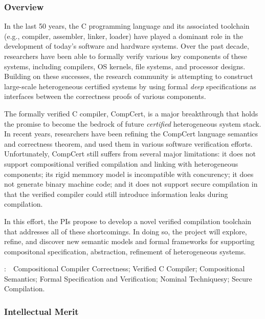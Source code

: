 \subsubsection*{Overview}

In the last 50 years, the C programming language and its associated
toolchain (e.g., compiler, assembler, linker, loader) have played a
dominant role in the development of today's software and hardware
systems.  Over the past decade, researchers have been able to formally
verify various key components of these systems, including compilers,
OS kernels, file systems, and processor designs. Building on these
successes, the research community is attempting to construct
large-scale heterogeneous certified systems by using formal {\em deep}
specifications as interfaces between the correctness proofs of various
components.

The formally verified C compiler, CompCert, is a major breakthrough
that holds the promise to become the bedrock of future {\em certified}
heterogeneous system stack. In recent years, researchers have been
refining the CompCert language semantics and correctness theorem, and
used them in various software verification efforts.  Unfortunately,
CompCert still suffers from several major limitations: it does
not support compositional verified compilation and linking with
heterogeneous components; its rigid memmory model is incompatible with
concurency; it does not generate binary machine code; and it does not
support secure compilation in that the verified compiler could still
introduce information leaks during compilation.

In this effort, the PIs propose to develop a novel verified
compilation toolchain that addresses all of these shortcomings. In
doing so, the project will explore, refine, and discover new semantic
models and formal frameworks for supporting compositonal
specification, abstraction, refinement of heterogeneous systems.

\vspace{+2mm}
:~~{Compositional Compiler Correctness; Verified C Compiler; Compositional Semantics; Formal Specification and Verification; Nominal Techniquesy; Secure Compilation.}

\subsubsection*{Intellectual Merit}

